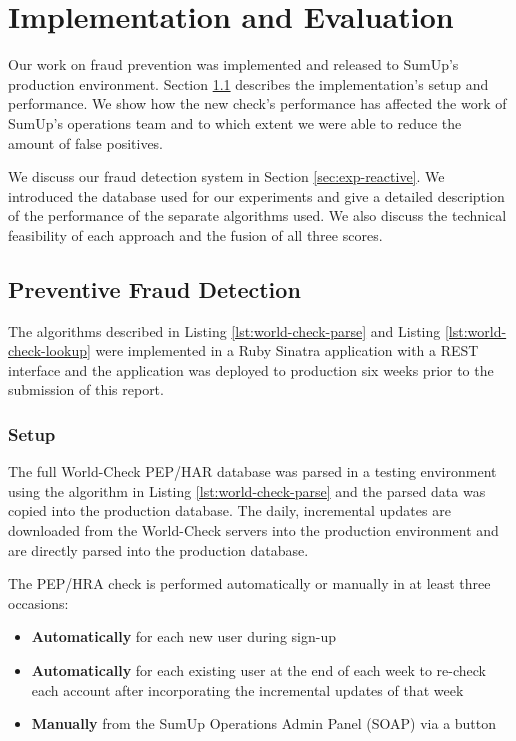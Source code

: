 \documentclass[a4paper, oneside]{csthesis}
\begin{document}
\chapter{Implementation and Evaluation}
\label{chp:experiments}


Our work on fraud prevention was implemented and released to SumUp's production environment. Section \ref{sec:exp-preventive} describes the implementation's setup and performance. We show how the new check's performance has affected the work of SumUp's operations team and to which extent we were able to reduce the amount of false positives.

We discuss our fraud detection system in Section \ref{sec:exp-reactive}. We introduced the database used for our experiments and give a detailed description of the performance of the separate algorithms used. We also discuss the technical feasibility of each approach and the fusion of all three scores.


\section{Preventive Fraud Detection}
\label{sec:exp-preventive}

The algorithms described in Listing \ref{lst:world-check-parse} and Listing \ref{lst:world-check-lookup} were implemented in a Ruby Sinatra application with a REST interface and the application was deployed to production six weeks prior to the submission of this report.

\subsection{Setup}

The full World-Check PEP/HAR database was parsed in a testing environment using the algorithm in Listing \ref{lst:world-check-parse} and the parsed data was copied into the production database. The daily, incremental updates are downloaded from the World-Check servers into the production environment and are directly parsed into the production database.

The PEP/HRA check is performed automatically or manually in at least three occasions:
\begin{itemize}
\item \textbf{Automatically} for each new user during sign-up
\item \textbf{Automatically} for each existing user at the end of each week to re-check each account after incorporating the incremental updates of that week
\item \textbf{Manually} from the SumUp Operations Admin Panel (SOAP) via a button
\end{itemize}
\end{document}
